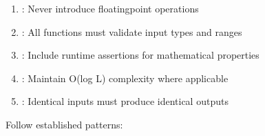 \documentclass[letterpaper,10pt,english]{sphinxmanual}
\begin{document}
\sphinxAtStartPar
{}
\begin{enumerate}
%
\item {} 
\sphinxAtStartPar
{}: Never introduce floating\sphinxhyphen{}point operations

\item {} 
\sphinxAtStartPar
{}: All functions must validate input types and ranges

\item {} 
\sphinxAtStartPar
{}: Include runtime assertions for mathematical properties

\item {} 
\sphinxAtStartPar
{}: Maintain O(log L) complexity where applicable

\item {} 
\sphinxAtStartPar
{}: Identical inputs must produce identical outputs

\end{enumerate}

\sphinxAtStartPar
{}

\sphinxAtStartPar
Follow established patterns:
\end{document}
